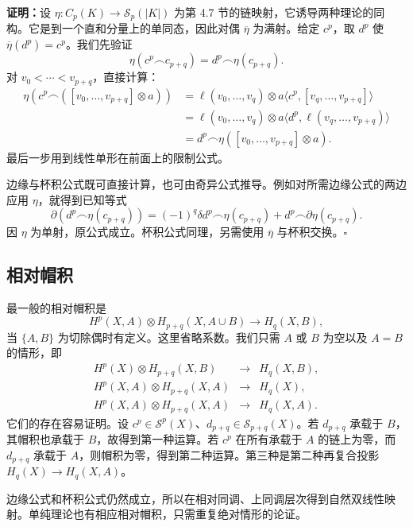 \textbf{证明：}设 $\eta:C_p(K)\to\mathcal S_p(|K|)$ 为第 4.7 节的链映射，它诱导两种理论的同构。它是到一个直和分量上的单同态，因此对偶 $\overline\eta$ 为满射。给定 $c^p$，取 $d^p$ 使 $\overline\eta(d^p)=c^p$。我们先验证
\[\eta(c^p\frown c_{p+q})=d^p\frown\eta(c_{p+q}).\]
对 $v_0<\cdots<v_{p+q}$，直接计算：
\begin{align*}
\eta(c^p\frown([v_0,\ldots,v_{p+q}]\otimes a))
&=\ell(v_0,\ldots,v_q)\otimes a\langle c^p,[v_q,\ldots,v_{p+q}]\rangle\\
&=\ell(v_0,\ldots,v_q)\otimes a\langle d^p,\ell(v_q,\ldots,v_{p+q})\rangle\\
&=d^p\frown\eta([v_0,\ldots,v_{p+q}]\otimes a).
\end{align*}
最后一步用到线性单形在前面上的限制公式。

边缘与杯积公式既可直接计算，也可由奇异公式推导。例如对所需边缘公式的两边应用 $\eta$，就得到已知等式
\[
\partial(d^p\frown\eta(c_{p+q}))
=(-1)^q\delta d^p\frown\eta(c_{p+q})+d^p\frown\partial\eta(c_{p+q}).
\]
因 $\eta$ 为单射，原公式成立。杯积公式同理，另需使用 $\overline\eta$ 与杯积交换。\hfill$\square$

\subsection*{相对帽积}
最一般的相对帽积是
\[H^p(X,A)\otimes H_{p+q}(X,A\cup B)\longrightarrow H_q(X,B),\]
当 $\{A,B\}$ 为切除偶时有定义。这里省略系数。我们只需 $A$ 或 $B$ 为空以及 $A=B$ 的情形，即
\[
\begin{array}{rcl}
H^p(X)\otimes H_{p+q}(X,B)&\to&H_q(X,B),\\
H^p(X,A)\otimes H_{p+q}(X,A)&\to&H_q(X),\\
H^p(X,A)\otimes H_{p+q}(X,A)&\to&H_q(X,A).
\end{array}
\]
它们的存在容易证明。设 $c^p\in\mathcal S^p(X)$、$d_{p+q}\in\mathcal S_{p+q}(X)$。若 $d_{p+q}$ 承载于 $B$，其帽积也承载于 $B$，故得到第一种运算。若 $c^p$ 在所有承载于 $A$ 的链上为零，而 $d_{p+q}$ 承载于 $A$，则帽积为零，得到第二种运算。第三种是第二种再复合投影 $H_q(X)\to H_q(X,A)$。

边缘公式和杯积公式仍然成立，所以在相对同调、上同调层次得到自然双线性映射。单纯理论也有相应相对帽积，只需重复绝对情形的论证。

